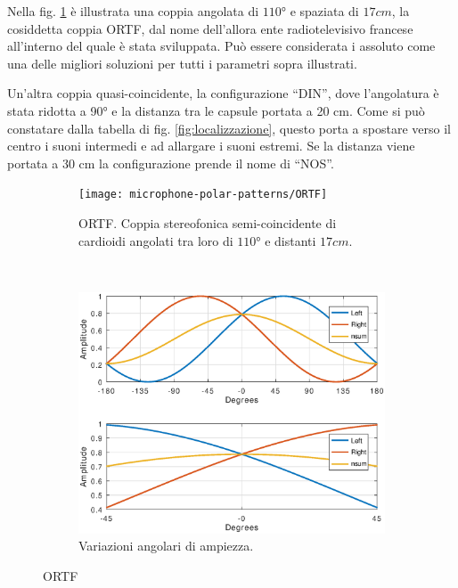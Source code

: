 Nella fig. \ref{pol:ortfsp} è illustrata una coppia angolata di $110°$ e spaziata
di $17cm$, la cosiddetta coppia ORTF, dal nome dell’allora ente radiotelevisivo
francese all’interno del quale è stata sviluppata. Può essere considerata i
assoluto come una delle migliori soluzioni per tutti i parametri sopra illustrati.

Un’altra coppia quasi-coincidente, la configurazione “DIN”, dove l’angolatura
è stata ridotta a 90° e la distanza tra le capsule portata a 20 cm. Come si può
constatare dalla tabella di fig. \ref{fig:localizzazione}, questo porta a
spostare verso il centro i suoni intermedi e ad allargare i suoni estremi.
Se la distanza viene portata a 30 cm la configurazione prende il nome di “NOS”.

\clearpage

\begin{figure}[t]
    \centering
    \begin{subfigure}[t]{0.99\textwidth}
        \centering
        \texttt{[image: microphone-polar-patterns/ORTF]}
        \caption[]{ORTF. Coppia stereofonica semi-coincidente di cardioidi angolati tra loro di $110°$ e distanti $17cm$.}%
        \label{pol:ortfsp}
    \end{subfigure}%
    \\
    \begin{subfigure}[t]{0.99\textwidth}
        \centering
        \includegraphics[width=12.5cm]{CAPITOLI/1000/IMG/ortfsub}
        \caption[]{Variazioni angolari di ampiezza.}%
        \label{plot:ortf}
    \end{subfigure}
    \caption[]{ORTF}
    \label{sp:ortf}
\end{figure}

